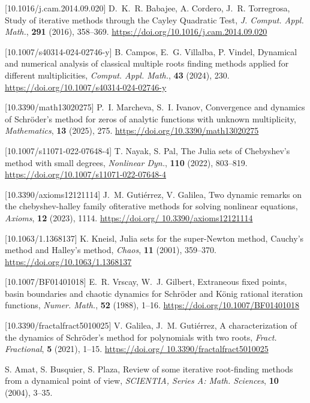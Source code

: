 \IfFileExists{aims.cls}{\documentclass{aims}}{\documentclass[11pt]{article}}
\numberwithin{equation}{section}
\theoremstyle{thmstyleone}%
\theoremstyle{thmstyletwo}%
\theoremstyle{thmstylethree}%
\providecommand{\doilink}[1]{\href{#1}{#1}}
\begin{document}
\begin{thebibliography}{999}
[10.1016/j.cam.2014.09.020]
D.~K.~R. Babajee, A. Cordero, J.~R. Torregrosa,  {Study of iterative methods through the Cayley Quadratic Test},
      {\it J. Comput. Appl. Math.},
      \textbf{291} (2016), 358--369. \doilink{https://doi.org/10.1016/j.cam.2014.09.020}


[10.1007/s40314-024-02746-y]
B. Campos, E.~G. Villalba, P. Vindel,  {Dynamical and numerical analysis of classical multiple roots finding methods applied for different multiplicities},
      {\it Comput. Appl. Math.},
      \textbf{43} (2024), 230. \doilink{ https://doi.org/10.1007/s40314-024-02746-y}


[10.3390/math13020275]
P.~I. Marcheva, S.~I. Ivanov,  {Convergence and dynamics of Schr\"oder's method for zeros of analytic functions with unknown multiplicity},
      {\it Mathematics},
      \textbf{13} (2025), 275. \doilink{https://doi.org/10.3390/math13020275}




[10.1007/s11071-022-07648-4]
T. Nayak, S. Pal,  {The Julia sets of Chebyshev’s method with small degrees},
      {\it  Nonlinear Dyn.},
      \textbf{110} (2022), 803--819. \doilink{https://doi.org/10.1007/s11071-022-07648-4}

[10.3390/axioms12121114]
J.~M. Guti\'errez, V. Galilea,  {Two dynamic remarks on the chebyshev-halley family ofiterative methods for solving nonlinear equations},
      {\it Axioms},
      \textbf{12} (2023), 1114. \doilink{https://doi.org/ 10.3390/axioms12121114}

[10.1063/1.1368137]
K. Kneisl,  {Julia sets for the super-Newton method, Cauchy's method and Halley's method},
      {\it Chaos},
      \textbf{11} (2001), 359--370. \doilink{https://doi.org/10.1063/1.1368137}

[10.1007/BF01401018]
E.~R. Vrscay, W.~J. Gilbert, {Extraneous fixed points, basin boundaries and chaotic dynamics for Schr\"oder and K\"onig rational iteration functions},
      {\it Numer. Math.},
      \textbf{52} (1988), 1--16. \doilink{https://doi.org/10.1007/BF01401018}


[10.3390/fractalfract5010025]
V. Galilea, J.~M. Guti\'errez,  {A characterization of the dynamics of Schr\"oder's method for polynomials with two roots},
      {\it Fract. Fractional},
      \textbf{5} (2021), 1--15. \doilink{https://doi.org/ 10.3390/fractalfract5010025}

S. Amat, S. Busquier, S. Plaza, 
{Review of some iterative root-finding methods from a dynamical point of view},
      {\it SCIENTIA, Series A: Math. Sciences},
      \textbf{10} (2004), 3--35. %


\end{thebibliography}
\end{document}
